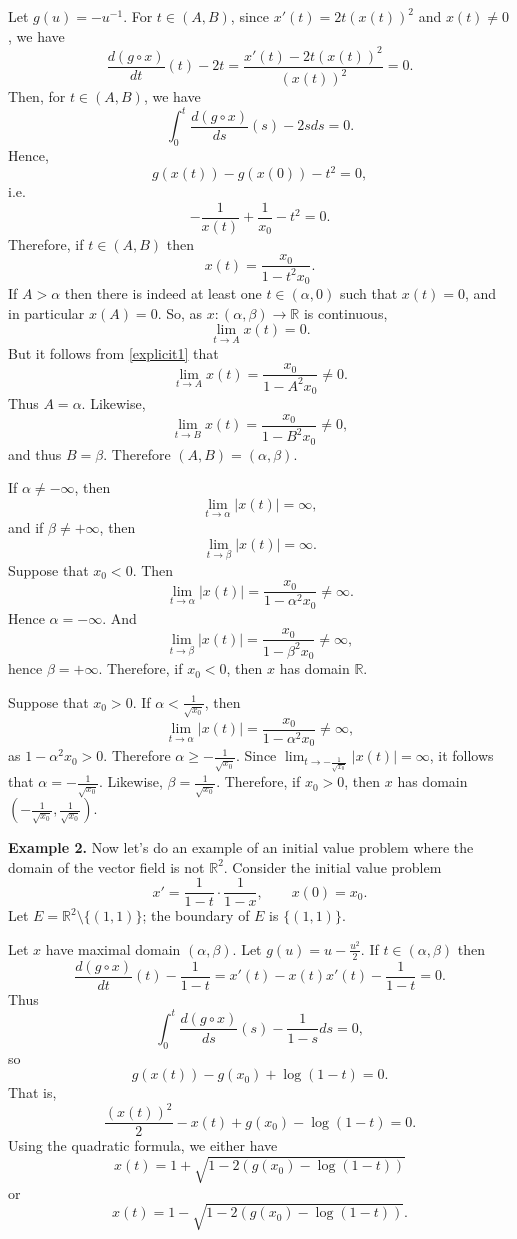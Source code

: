 \documentclass{article}
\begin{document}
Let $g(u)=-u^{-1}$.
For $t \in (A,B)$, since $x'(t)=2t (x(t))^2$ and $x(t) \neq 0$, we have
\[
\frac{d (g \circ x)}{dt}(t)-2t=\frac{x'(t)-2t(x(t))^2}{(x(t))^2}=0.
\]
Then, for $t \in (A,B)$, we have
\[
\int_0^t \frac{d (g \circ x)}{ds}(s)-2s ds = 0.
\]
Hence,
\[
g(x(t))-g(x(0))-t^2=0,
\]
i.e.
\[
-\frac{1}{x(t)}+\frac{1}{x_0}-t^2=0.
\]
Therefore, if $t \in (A,B)$ then
\begin{equation}
x(t)=\frac{x_0}{1-t^2x_0}.
\label{explicit1}
\end{equation}
If $A > \alpha$ then there is indeed at least one $t \in (\alpha,0)$ such that $x(t)=0$, and in particular $x(A)=0$. So, as $x:(\alpha,\beta) \to \mathbb{R}$ is continuous,
\[
\lim_{t \to A} x(t) = 0.
\]
But it follows from \eqref{explicit1} that
\[
\lim_{t \to A} x(t) = \frac{x_0}{1-A^2 x_0} \neq 0.
\]
Thus $A = \alpha$. Likewise, 
\[
\lim_{t \to B} x(t) = \frac{x_0}{1-B^2 x_0} \neq 0,
\]
and thus $B=\beta$. Therefore $(A,B)=(\alpha,\beta)$. 

If $\alpha \neq -\infty$, then 
\[
\lim_{t \to \alpha} |x(t)| = \infty,
\]
and if $\beta \neq +\infty$, then
\[
\lim_{t \to \beta} |x(t)| = \infty.
\]
Suppose that $x_0<0$. Then
\[
\lim_{t \to \alpha} |x(t)| = \frac{x_0}{1-\alpha^2 x_0} \neq \infty.
\]
Hence $\alpha=-\infty$. And 
\[
\lim_{t \to \beta} |x(t)| = \frac{x_0}{1-\beta^2 x_0} \neq \infty,
\]
hence $\beta=+\infty$. Therefore, if $x_0<0$, then $x$ has domain $\mathbb{R}$.

Suppose that $x_0>0$. If $\alpha < \frac{1}{\sqrt{x_0}}$, then
\[
\lim_{t \to \alpha} |x(t)| = \frac{x_0}{1-\alpha^2 x_0} \neq \infty,
\]
as $1-\alpha^2 x_0>0$. Therefore $\alpha \geq -\frac{1}{\sqrt{x_0}}$. Since $\lim_{t \to  -\frac{1}{\sqrt{x_0}}}  |x(t)|=\infty$, it follows that
$\alpha=-\frac{1}{\sqrt{x_0}}$. Likewise,
$\beta=\frac{1}{\sqrt{x_0}}$. Therefore, if $x_0>0$, then $x$ has domain $\left(- \frac{1}{\sqrt{x_0}},\frac{1}{\sqrt{x_0}} \right)$.


\textbf{Example 2.} Now let's do an example of an initial value problem where the domain of the vector field is not $\mathbb{R}^2$. 
Consider the initial value problem
\[
x'=\frac{1}{1-t}\cdot \frac{1}{1-x}, \qquad x(0)=x_0.
\]
Let $E=\mathbb{R}^2 \setminus \{(1,1)\}$; the boundary of $E$ is $\{(1,1)\}$. 

Let $x$ have maximal domain $(\alpha,\beta)$. Let $g(u)=u-\frac{u^2}{2}$. If $t \in (\alpha,\beta)$ then
\[
\frac{d (g \circ x)}{dt}(t)-\frac{1}{1-t}=x'(t)-x(t)x'(t)-\frac{1}{1-t}=0.
\]
Thus
\[
\int_0^t \frac{d (g \circ x)}{ds}(s)-\frac{1}{1-s} ds=0,
\]
so
\[
g(x(t))-g(x_0)+\log(1-t)=0.
\]
That is,
\[
\frac{(x(t))^2}{2}-x(t)+g(x_0)-\log(1-t)=0.
\]
Using the quadratic formula, we either have
\[
x(t)=1+\sqrt{1-2(g(x_0)-\log(1-t))}
\]
or
\[
x(t)=1-\sqrt{1-2(g(x_0)-\log(1-t))}.
\]
\end{document}
